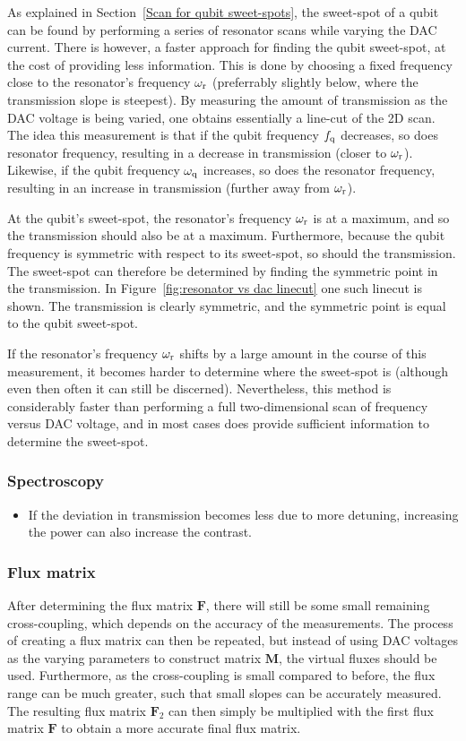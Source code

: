         As explained in Section~\ref{Scan for qubit sweet-spots}, the sweet-spot of a qubit can be found by performing a series of resonator scans while varying the DAC current. There is however, a faster approach for finding the qubit sweet-spot, at the cost of providing less information. This is done by choosing a fixed frequency close to the resonator's frequency $\omega_\text{r}$ (preferrably slightly below, where the transmission slope is steepest). By measuring the amount of transmission as the DAC voltage is being varied, one obtains essentially a line-cut of the 2D scan. The idea this measurement is that if the qubit frequency $f_\text{q}$ decreases, so does resonator frequency, resulting in a decrease in transmission (closer to $\omega_\text{r}$). Likewise, if the qubit frequency $\omega_\text{q}$ increases, so does the resonator frequency, resulting in an increase in transmission (further away from $\omega_\text{r}$).

        At the qubit's sweet-spot, the resonator's frequency $\omega_\text{r}$ is at a maximum, and so the transmission should also be at a maximum. Furthermore, because the qubit frequency is symmetric with respect to its sweet-spot, so should the transmission. The sweet-spot can therefore be determined by finding the symmetric point in the transmission. In Figure~\ref{fig:resonator vs dac linecut} one such linecut is shown. The transmission is clearly symmetric, and the symmetric point is equal to the qubit sweet-spot.

        If the resonator's frequency $\omega_\text{r}$ shifts by a large amount in the course of this measurement, it becomes harder to determine where the sweet-spot is (although even then often it can still be discerned). Nevertheless, this method is considerably faster than performing a full two-dimensional scan of frequency versus DAC voltage, and in most cases does provide sufficient information to determine the sweet-spot.


      \subsubsection{Spectroscopy}
        \begin{itemize}
          \item If the deviation in transmission becomes less due to more detuning, increasing the power can also increase the contrast.
        \end{itemize}
      \subsubsection{Flux matrix}
        After determining the flux matrix $\boldsymbol{F}$, there will still be some small remaining cross-coupling, which depends on the accuracy of the measurements. The process of creating a flux matrix can then be repeated, but instead of using DAC voltages as the varying parameters to construct matrix $\boldsymbol{M}$, the virtual fluxes should be used. Furthermore, as the cross-coupling is small compared to before, the flux range can be much greater, such that small slopes can be accurately measured. The resulting flux matrix $\boldsymbol{F}_2$ can then simply be multiplied with the first flux matrix $\boldsymbol{F}$ to obtain a more accurate final flux matrix.
